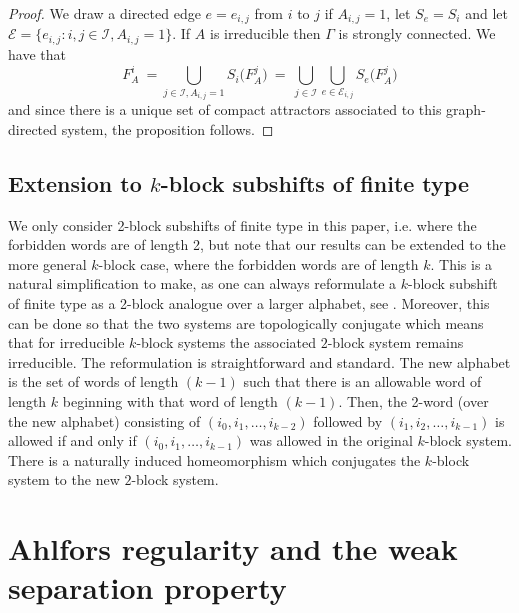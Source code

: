 \documentclass[11pt,english,british]{article}
\numberwithin{equation}{section}
\begin{document}
\begin{proof}
We draw a directed edge $e=e_{i,j}$ from $i$ to $j$ if $A_{i,j}=1$, let $S_{e}=S_{i}$ and let $\mathcal{E}=\{e_{i,j}:i,j \in \mathcal{I}, A_{i,j}=1\}$. If $A$ is irreducible then $\Gamma$ is strongly connected. We have that
\[
F_{A}^{i} \ =\bigcup_{j \in \mathcal{I},A_{i,j}=1} S_{i}\big(F_A^{j}\big) \ = \  \bigcup_{j \in \mathcal{I}} \bigcup_{e \in \mathcal{E}_{i,j}} S_e\big(F_A^j\big)
\]
and since there is a unique set of compact attractors associated to this graph-directed system, the proposition follows.
\end{proof}






\subsection{Extension to $k$-block subshifts of finite type}

We only consider 2-block subshifts of finite type in this paper, i.e. where the forbidden words are of length 2, but note that our results can be extended to the more general $k$-block case, where the forbidden words are of length $k$.  This is a natural simplification to make, as one can always reformulate a $k$-block subshift of finite type as a 2-block analogue over a larger alphabet, see \cite[Theorem 2.3.2]{lind}.  Moreover, this can be done so that the two systems are topologically conjugate which means that for irreducible $k$-block systems the associated $2$-block system remains irreducible.  The reformulation is straightforward and standard.  The new alphabet is the set of words of length $(k-1)$ such that there is an allowable word of length $k$ beginning with that word of length $(k-1)$.  Then, the 2-word (over the new alphabet) consisting of $(i_0, i_1, \dots, i_{k-2})$ followed by  $(i_1, i_2 ,\dots, i_{k-1})$ is allowed if and only if $(i_0, i_1, \dots, i_{k-1})$ was allowed in the original $k$-block system.  There is a naturally induced homeomorphism which conjugates the $k$-block system to the new $2$-block system.









\section{Ahlfors regularity and the weak separation property}
\end{document}
